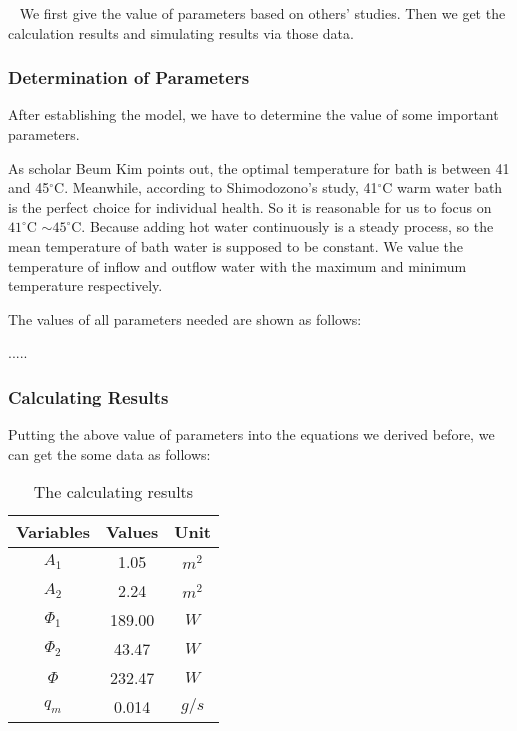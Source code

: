 \documentclass{mcmthesis}
\begin{document}
\quad~ We first give the value of parameters based on others’ studies. Then we 
get the calculation results and simulating results via those data.

\subsubsection{Determination of Parameters}

After establishing the model, we have to determine the value of some
important parameters.

As scholar Beum Kim points out, the optimal temperature for bath is
between 41 and 45$^\circ$C. Meanwhile, according to Shimodozono's study, 
41$^\circ$C warm water bath is the perfect choice for individual health. 
So it is reasonable for us to focus on $41^\circ$C $\sim 45^\circ$C. Because 
adding hot water continuously is a steady process, so the mean temperature 
of bath water is supposed to be constant. We value the temperature of inflow 
and outflow water with the maximum and minimum temperature respectively.

The values of all parameters needed are shown as follows:

.....

\subsubsection{Calculating Results}

Putting the above value of parameters into the equations we derived before, we 
can get the some data as follows:

\begin{table}[h]  %
\centering        %
\caption{The calculating results}  %
\vspace{0.15cm}
\label{tab2}                       %
\begin{tabular}{|c|c|c|}  %
\hline                    %
Variables & Values & Unit     \\ \hline  %
$A_1$     & 1.05   &   $m^2$  \\ \hline
$A_2$     & 2.24   &   $m^2$  \\ \hline
$\Phi_1$  & 189.00 &   $W$   \\ \hline
$\Phi_2$  & 43.47  &   $W$   \\ \hline
$\Phi$    & 232.47 &   $W$   \\ \hline
$q_m$     & 0.014  &   $g/s$ \\ \hline
\end{tabular}
\end{table}
\end{document}
